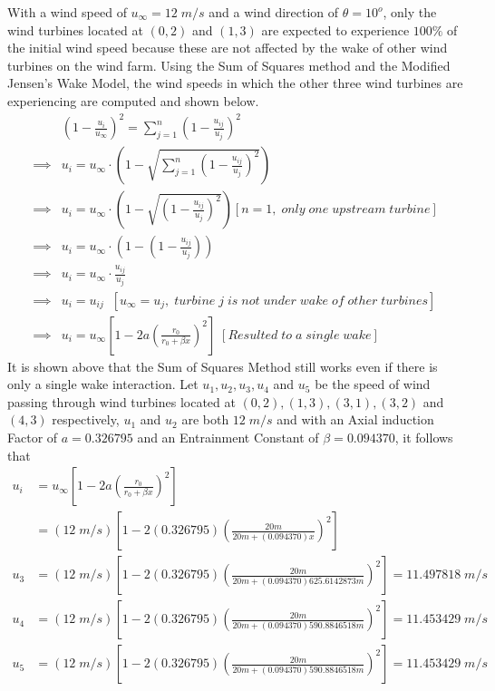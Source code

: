     With a wind speed of $u_\infty=12\;m/s$ and a wind direction of $\theta=10^o$, only the wind turbines located at $(0,2)$ and $(1,3)$ are expected to experience $100\%$ of the initial wind speed because these are not affected by the wake of other wind turbines on the wind farm. Using the Sum of Squares method and the Modified Jensen's Wake Model, the wind speeds in which the other three wind turbines are experiencing are computed and shown below.
    \begin{align*}
        &\left(1-\frac{u_i}{u_\infty}\right)^2=\sum_{j=1}^{n}\left(1-\frac{u_{ij}}{u_j}\right)^2 \\
        \implies 
        & u_i=u_\infty\cdot\left(1-\sqrt{\sum_{j=1}^{n}\left(1-\frac{u_{ij}}{u_j}\right)^2}\right) \\
        \implies 
        & u_i=u_\infty\cdot\left(1-\sqrt{\left(1-\frac{u_{ij}}{u_j}\right)^2}\right) [n=1, \;only \;one \;upstream \;turbine] \\
        \implies 
        & u_i=u_\infty\cdot\left(1-\left(1-\frac{u_{ij}}{u_j}\right)\right) \\
        \implies 
        & u_i=u_\infty\cdot\frac{u_{ij}}{u_j} \\
        \implies 
        & u_i=u_{ij} \;\;[u_\infty=u_j,\;turbine \;j \;is \;not \;under \;wake \;of \;other \;turbines] \\
        \implies 
        & u_i=u_{\infty}\left[1 - 2a\left(\frac{r_{0}}{r_{0}+\beta x}\right)^2\right] \;[Resulted \;to \;a \;single \;wake]
    \end{align*}
    It is shown above that the Sum of Squares Method still works even if there is only a single wake interaction. Let $u_1,u_2,u_3,u_4$ and $u_5$ be the speed of wind passing through wind turbines located at $(0,2),(1,3),(3,1),(3,2)$ and $(4,3)$ respectively, $u_1$ and $u_2$ are both $12\;m/s$ and with an Axial induction Factor of $a=0.326795$ and an Entrainment Constant of $\beta=0.094370$, it follows that
    \begin{align*}
        u_i
        & =u_{\infty}\left[1 - 2a\left(\frac{r_{0}}{r_{0}+\beta x}\right)^2\right] \\
        & =\left(12\;m/s\right)\left[1 - 2\left(0.326795\right)\left(\frac{20m}{20m+\left(0.094370\right) x}\right)^2\right] \\
        u_3
        & =\left(12\;m/s\right)\left[1 - 2\left(0.326795\right)\left(\frac{20m}{20m+\left(0.094370\right) 625.6142873m}\right)^2\right] = 11.497818\;m/s \\
        u_4
        & =\left(12\;m/s\right)\left[1 - 2\left(0.326795\right)\left(\frac{20m}{20m+\left(0.094370\right) 590.8846518m}\right)^2\right] = 11.453429\;m/s \\
        u_5
        & =\left(12\;m/s\right)\left[1 - 2\left(0.326795\right)\left(\frac{20m}{20m+\left(0.094370\right) 590.8846518m}\right)^2\right] = 11.453429\;m/s
    \end{align*}
    
